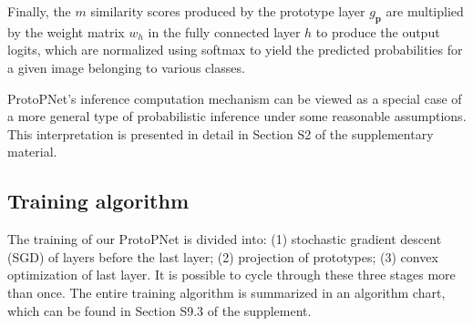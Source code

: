 \documentclass{article}
\theoremstyle{definition}
\theoremstyle{remark}
\begin{document}
Finally, the $m$ similarity scores produced by the prototype layer $g_{\mathbf{p}}$ are multiplied by the weight matrix $w_h$ in the fully connected layer $h$ to produce the output logits, which are normalized using softmax to yield the predicted probabilities for a given image belonging to various classes.

ProtoPNet's inference computation mechanism can be viewed as a special case of a more general type of probabilistic inference under some reasonable assumptions. This interpretation is presented in detail in Section S2 of the supplementary material.


%


\subsection{Training algorithm}\label{sec:training}
%
The training of our ProtoPNet is divided into: (1) stochastic gradient descent (SGD) of layers before the last layer; (2) projection of prototypes; (3) convex optimization of last layer. It is possible to cycle through these three stages more than once. The entire training algorithm is summarized in an algorithm chart, which can be found in Section S9.3 of the supplement.
\end{document}

